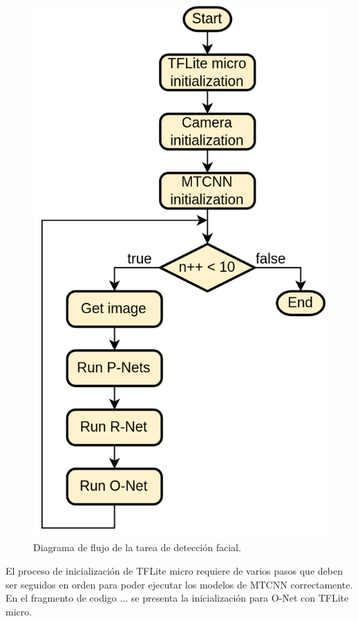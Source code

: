 \begin{figure}[h]
	\centering
	\includegraphics[scale=0.22]{./Figures/fw_detection_flow.png}
	\caption{Diagrama de flujo de la tarea de detección facial.}
	\label{fig:fw_detect_flow}
\end{figure}

El proceso de inicialización de TFLite micro requiere de varios pasos que deben ser seguidos en orden para poder ejecutar los modelos de MTCNN correctamente. En el fragmento de codigo ... se presenta la inicialización para O-Net con TFLite micro.

